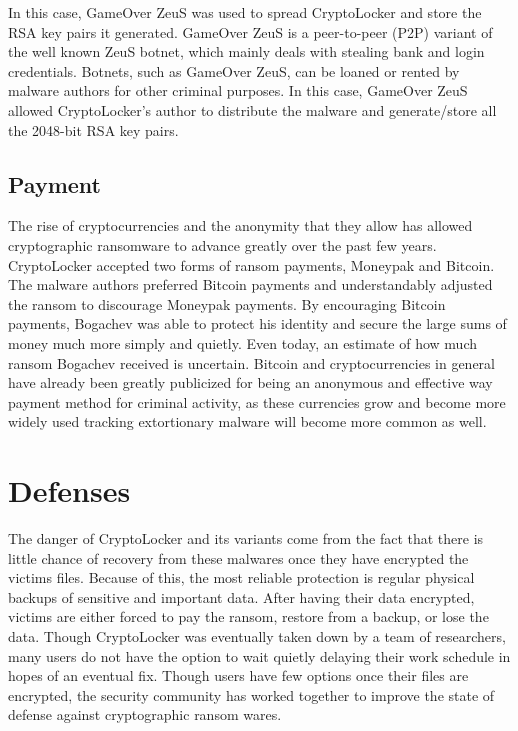 \documentclass[11.5pt]{article}
\begin{document}
In this case, GameOver ZeuS was used to spread CryptoLocker and store the RSA key pairs it generated.  GameOver ZeuS is a peer-to-peer (P2P) variant of the well known ZeuS botnet, which mainly deals with stealing bank and login credentials.  Botnets, such as GameOver ZeuS, can be loaned or rented by malware authors for other criminal purposes.  In this case, GameOver ZeuS allowed CryptoLocker's author to distribute the malware and generate/store all the 2048-bit RSA key pairs.  

\subsection{Payment}

The rise of cryptocurrencies and the anonymity that they allow has allowed cryptographic ransomware to advance greatly over the past few years.  CryptoLocker accepted two forms of ransom payments, Moneypak and Bitcoin.  The malware authors preferred Bitcoin payments and understandably adjusted the ransom to discourage Moneypak payments. By encouraging Bitcoin payments, Bogachev was able to protect his identity and secure the large sums of money much more simply and quietly. Even today, an estimate of how much ransom Bogachev received is uncertain.  Bitcoin and cryptocurrencies in general have already been greatly publicized for being an anonymous and effective way payment method for criminal activity, as these currencies grow and become more widely used tracking extortionary malware will become more common as well. 

\section{Defenses}

The danger of CryptoLocker and its variants come from the fact that there is little chance of recovery from these malwares once they have encrypted the victims files.  Because of this, the most reliable protection is regular physical backups of sensitive and important data.  After having their data encrypted, victims are either forced to pay the ransom, restore from a backup, or lose the data.  Though CryptoLocker was eventually taken down by a team of researchers, many users do not have the option to wait quietly delaying their work schedule in hopes of an eventual fix.  Though users have few options once their files are encrypted, the security community has worked together to improve the state of defense against cryptographic ransom wares. \\
\end{document}
